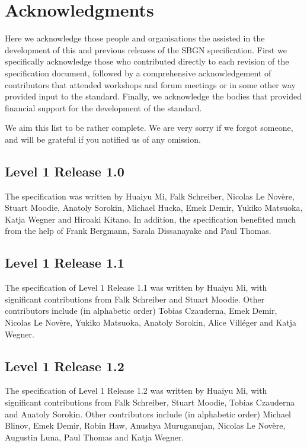 \chapter{Acknowledgments}\label{sec:acknowledgments}

Here we acknowledge those people and organisations the assisted in the development of this and previous releases of the SBGN \AFl specification. First we specifically acknowledge those who contributed directly to each revision of the  specification document, followed by a comprehensive acknowledgement of contributors that attended workshops and forum meetings or in some other way provided input to the standard. Finally, we acknowledge the bodies that provided financial support for the development of the standard.


 We aim this list to be rather complete. We are very sorry if we forgot someone, and will be grateful if you notified us of any omission.

\section{Level 1 Release 1.0}

The specification was written by Huaiyu Mi, Falk Schreiber, Nicolas Le Nov\`{e}re, Stuart Moodie, Anatoly Sorokin, Michael Hucka, Emek Demir, Yukiko Matsuoka, Katja Wegner and Hiroaki Kitano. In addition, the specification benefited much from the help of Frank Bergmann, Sarala Dissanayake and Paul Thomas.

\section{Level 1 Release 1.1}
The specification of \AF Level 1 Release 1.1 was written by Huaiyu Mi, with significant contributions from Falk Schreiber and Stuart Moodie.  Other contributors include (in alphabetic order) Tobias Czauderna, Emek Demir, Nicolas Le Nov\`{e}re, Yukiko Matsuoka, Anatoly Sorokin, Alice Vill\'{e}ger and Katja Wegner.

\section{Level 1 Release 1.2}
The specification of \AF Level 1 Release 1.2 was written by Huaiyu Mi, with significant contributions from Falk Schreiber, Stuart Moodie, Tobias Czauderna and Anatoly Sorokin.  Other contributors include (in alphabetic order) Michael Blinov, Emek Demir, Robin Haw, Anushya Muruganujan, Nicolas Le Nov\`{e}re, Augustin Luna, Paul Thomas and Katja Wegner.

